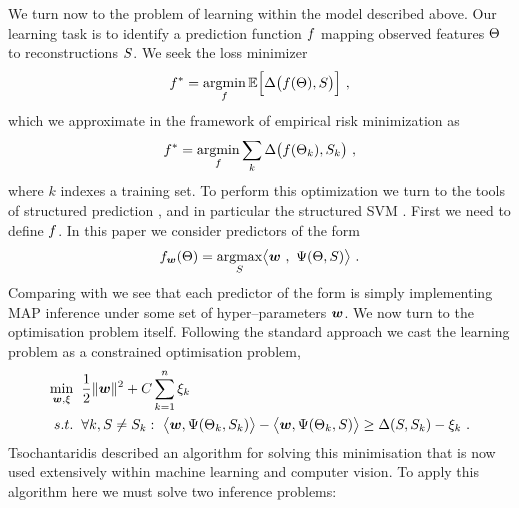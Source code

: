 We turn now to the problem of learning within the model described
above. Our learning task is to identify a prediction function
$f$ mapping observed features $\Theta$ to reconstructions
$S$. We seek the loss minimizer
\begin{equation}
  f^* = 
  \operatorname*{argmin}_{f} 
  \mathbb{E} \Bigl[ 
    \Delta\bigl(f(\Theta),S\bigr)
    \Bigr] ~,
\end{equation}
which we approximate in the framework of empirical risk minimization as
\begin{equation}
  f^* = 
  \operatorname*{argmin}_{f} 
  \sum_k \Delta\bigl(f(\Theta_k),S_k\bigr) ~,
\end{equation}
where $k$ indexes a training set. To perform this optimization we
turn to the tools of structured prediction \cite{Bakir07}, and in
particular the structured SVM \cite{Tsochantaridis04}. First we need
to define $f$. In this paper we consider predictors of the
form
\begin{equation}
  f_{\boldsymbol{w}}(\Theta) = \operatorname*{argmax}_{S} 
  \bigl\langle \boldsymbol{w} ~,~ \Psi(\Theta,S) \bigr\rangle
  ~.
  \label{eq:predictor-class}
\end{equation}
Comparing with  we see that each
predictor of the form  is simply implementing
MAP inference under some set of hyper--parameters $\boldsymbol{w}$. We now
turn to the optimisation problem itself. Following the standard
approach \cite{Bakir07} we cast the learning problem as a constrained
optimisation problem,
\begin{equation}
  \begin{split}
    \min_{\boldsymbol{w},\xi} &
      \hspace{2mm} 
    \frac{1}{2} \|\boldsymbol{w}\|^2 +
      C \sum_{k=1}^n \xi_k\\
    s.t. & \hspace{2mm} \forall k, S \neq S_k:~
      \bigl\langle\boldsymbol{w}, \Psi(\Theta_k,S_k)\bigr\rangle -
      \bigl\langle\boldsymbol{w}, \Psi(\Theta_k,S)\bigr\rangle
      \geq
      \Delta(S,S_k) - \xi_k ~.
  \end{split}
  \label{eq:svm-problem}
\end{equation}
Tsochantaridis \etal \cite{Tsochantaridis04} described an algorithm
for solving this minimisation that is now used extensively within
machine learning and computer vision. To apply this algorithm here we
must solve two inference problems:
